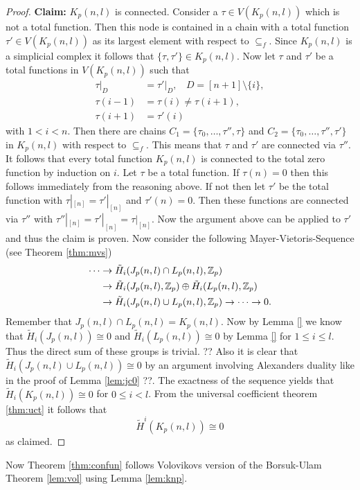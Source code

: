 \begin{proof}
  \textbf{Claim:} $K_p(n,l)$ is connected. Consider a $\tau \in V(K_p(n,l))$ which is not a total function. Then this node is contained in a chain with a total function $\tau' \in V(K_p(n,l))$ as its largest element with respect to $\subseteq_f$. Since $K_p(n,l)$ is a simplicial complex it follows that $\{\tau, \tau'\} \in K_p(n,l)$.
  Now let $\tau$ and $\tau'$ be a total functions in $V(K_p(n,l))$ such that
  \begin{align*}
    \tau|_D &= \tau'|_D, \:\:\:\: D = [n+1]\setminus \{i\}, \\
    \tau(i-1) &= \tau(i) \neq \tau(i+1), \\
    \tau(i+1) &= \tau'(i)
  \end{align*}
  with $1 < i < n$.
  Then there are chains $C_1 = \{\tau_0, \ldots, \tau'', \tau\}$ and $C_2 = \{\tau_0, \ldots, \tau'', \tau' \}$ in $K_p(n,l)$ with respect to $\subseteq_f$. This means that $\tau$ and $\tau'$ are connected via $\tau''$.
  It follows that every total function $K_p(n,l)$ is connected to the total zero function by induction on $i$. Let $\tau$ be a total function. If $\tau(n) = 0$ then this follows immediately from the reasoning above. If not then let $\tau'$ be the total function with $\tau|_{[n]} = \tau'|_{[n]}$ and $\tau'(n) = 0$. Then these functions are connected via $\tau''$ with $\tau''|_{[n]} = \tau'|_{[n]} = \tau|_{[n]}$. Now the argument above can be applied to $\tau'$ and thus the claim is proven.
  Now consider the following Mayer-Vietoris-Sequence (see Theorem \ref{thm:mvs})
  \begin{align*}
    \label{eq:mayvietk}
    \cdots &\to \tilde{H}_i(J_p(n,l) \cap L_p(n,l), \mathbb{Z}_p) \\ &\to \tilde{H}_i(J_p(n,l), \mathbb{Z}_p) \oplus \tilde{H}_i(L_p(n,l), \mathbb{Z}_p) \\ &\to \tilde{H}_i(J_p(n,l) \cup L_p(n,l), \mathbb{Z}_p) \to \cdots \to 0.
  \end{align*}
  Remember that $J_p(n,l) \cap L_p(n,l) = K_p(n,l)$. Now by Lemma \ref{} we know that $\tilde{H}_i(J_p(n,l)) \cong 0$ and $\tilde{H}_i(L_p(n,l)) \cong 0$ by Lemma \ref{} for $1 \leq i \leq l$. Thus the direct sum of these groups is trivial. ?? Also it is clear that $\tilde{H}_i(J_p(n,l) \cup L_p(n,l)) \cong 0$ by an argument involving Alexanders duality like in the proof of Lemma \ref{lem:jc0} ??. The exactness of the sequence yields that $\tilde{H}_i(K_p(n,l)) \cong 0$ for $0 \leq i < l$. From the universal coefficient theorem \ref{thm:uct} it follows that \[\tilde{H}^i(K_p(n,l)) \cong 0\] as claimed.
\end{proof}

Now Theorem \ref{thm:confun} follows Volovikovs version of the Borsuk-Ulam Theorem \ref{lem:vol} using Lemma \ref{lem:knp}. 
